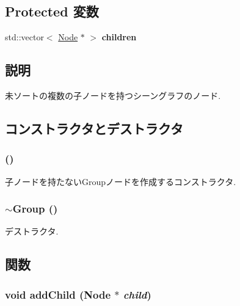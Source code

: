 \subsection*{Protected 変数}
\begin{CompactItemize}
\item 
\hypertarget{classm3g_1_1Group_00bd6c5c98c6cfcf7dd1c7381bfa20fd}{
std::vector$<$ \hyperlink{classm3g_1_1Node}{Node} $\ast$ $>$ \textbf{children}}
\label{classm3g_1_1Group_00bd6c5c98c6cfcf7dd1c7381bfa20fd}

\end{CompactItemize}


\subsection{説明}
未ソートの複数の子ノードを持つシーングラフのノード. 

\subsection{コンストラクタとデストラクタ}
\hypertarget{classm3g_1_1Group_0b29b9393b4b6856ac75b759f4166c13}{
\subsubsection[{Group}]{ ()}}
\label{classm3g_1_1Group_0b29b9393b4b6856ac75b759f4166c13}


子ノードを持たないGroupノードを作成するコンストラクタ. \hypertarget{classm3g_1_1Group_a2a755272411c0d861f46f30970f5ca5}{
\subsubsection[{$\sim$Group}]{\setlength{\rightskip}{0pt plus 5cm}$\sim${\bf Group} ()}}
\label{classm3g_1_1Group_a2a755272411c0d861f46f30970f5ca5}


デストラクタ. 

\subsection{関数}
\hypertarget{classm3g_1_1Group_f7c798f6f7924dc14403df261f82153a}{
\subsubsection[{addChild}]{\setlength{\rightskip}{0pt plus 5cm}void addChild ({\bf Node} $\ast$ {\em child})}}
\label{classm3g_1_1Group_f7c798f6f7924dc14403df261f82153a}



